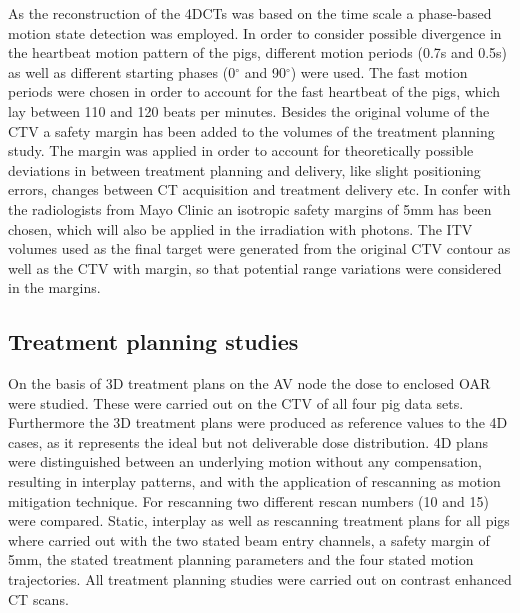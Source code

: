 \documentclass[type=dr, dr=rernat, accentcolor=tud7b,colorbacktitle, bigchapter, openright, twoside, 12pt ]{tudthesis}
\begin{document}
As the reconstruction of the 4DCTs was based on the time scale a phase-based motion state detection was employed. 
In order to consider possible divergence in the heartbeat motion pattern of the pigs, different motion periods (0.7s and 0.5s) as well as 
different starting phases (0$^{\circ}$ and 90$^{\circ}$) were used. The fast motion periods were chosen in order to account for the fast 
heartbeat of the pigs, which lay between 110 and 120 beats per minutes.\newline
\newline
Besides the original volume of the CTV a safety margin has been added to the volumes of the treatment planning study. The margin was applied 
in order to account for theoretically possible deviations in between treatment planning and delivery, like slight positioning errors, changes 
between CT acquisition and treatment delivery etc. In confer with the radiologists from Mayo Clinic an isotropic safety margins of 5mm 
has been chosen, which will also be applied in the irradiation with photons. The ITV volumes used as the final target were generated from the 
original CTV contour as well as the CTV with margin, so that potential range variations were considered in the margins. 


\subsection{Treatment planning studies}

On the basis of 3D treatment plans on the AV node the dose to enclosed OAR were studied. These were carried out on the CTV of all four pig data 
sets. Furthermore the 3D treatment plans were produced as reference values to the 4D cases, as it represents the ideal but not deliverable 
dose distribution. 
4D plans were distinguished between an underlying motion without any compensation, resulting in interplay patterns, and with the application of 
rescanning as motion mitigation technique. For rescanning two different rescan numbers (10 and 15) were compared.
Static, interplay as well as rescanning treatment plans for all pigs where carried out with the two stated beam entry channels,
a safety margin of 5mm, the stated treatment planning parameters and the four stated motion trajectories. 
All treatment planning studies were carried out on contrast enhanced CT scans. 
\end{document}
